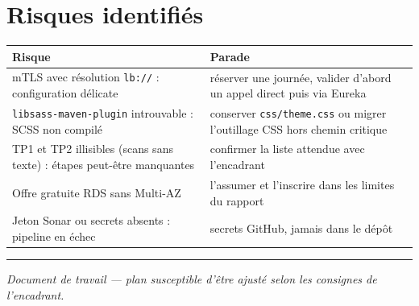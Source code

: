 \documentclass[12pt,a4paper]{article}
\newcommand{\code}[1]{\texttt{\small #1}}
\begin{document}
\section*{Risques identifi\'es}

\begin{center}
\small
\begin{tabularx}{\textwidth}{@{}p{5.2cm}X@{}}
\toprule
\textbf{Risque} & \textbf{Parade} \\
\midrule
mTLS avec r\'esolution \code{lb://} : configuration d\'elicate &
r\'eserver une journ\'ee, valider d'abord un appel direct puis via Eureka \\
\code{libsass-maven-plugin} introuvable : SCSS non compil\'e &
conserver \code{css/theme.css} ou migrer l'outillage CSS hors chemin critique \\
TP1 et TP2 illisibles (scans sans texte) : \'etapes peut-\^etre manquantes &
confirmer la liste attendue avec l'encadrant \\
Offre gratuite RDS sans Multi-AZ &
l'assumer et l'inscrire dans les limites du rapport \\
Jeton Sonar ou secrets absents : pipeline en \'echec &
secrets GitHub, jamais dans le d\'ep\^ot \\
\bottomrule
\end{tabularx}
\end{center}

\vspace{0.6cm}
\hrule
\vspace{0.3cm}
{\small\itshape Document de travail --- plan susceptible d'\^etre ajust\'e selon les consignes
de l'encadrant.}
\end{document}
